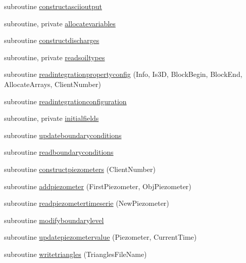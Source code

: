 \begin{DoxyCompactItemize}
subroutine \mbox{\hyperlink{namespacemoduleporousmedia_a14d726826714b21efcb1bdd8fe521dbc}{constructasciioutput}}
\item 
subroutine, private \mbox{\hyperlink{namespacemoduleporousmedia_a908fc394580adaa43494724ec7882eca}{allocatevariables}}
\item 
subroutine \mbox{\hyperlink{namespacemoduleporousmedia_ac4e498c09f58d0ecca6f79a2a268bb84}{constructdischarges}}
\item 
subroutine, private \mbox{\hyperlink{namespacemoduleporousmedia_a7aef95520258c11f2ce4493e2bef61c8}{readsoiltypes}}
\item 
subroutine \mbox{\hyperlink{namespacemoduleporousmedia_af773f6dce68c6222d17ca3f4fe88192d}{readintegrationpropertyconfig}} (Info, Is3D, Block\+Begin, Block\+End, Allocate\+Arrays, Client\+Number)
\item 
subroutine \mbox{\hyperlink{namespacemoduleporousmedia_afd9c6f0efb919260c9cb27d5f27faf98}{readintegrationconfiguration}}
\item 
subroutine, private \mbox{\hyperlink{namespacemoduleporousmedia_a35c831104f825a9f11f297800f87ecab}{initialfields}}
\item 
subroutine \mbox{\hyperlink{namespacemoduleporousmedia_ab48cf69fc08a66f3d4cfa5d9624e5ebf}{updateboundaryconditions}}
\item 
subroutine \mbox{\hyperlink{namespacemoduleporousmedia_afc9e4c782508e0d8b55b1c444d54d741}{readboundaryconditions}}
\item 
subroutine \mbox{\hyperlink{namespacemoduleporousmedia_ac3173bc46df00d4f9eeea325d87cd8d7}{constructpiezometers}} (Client\+Number)
\item 
subroutine \mbox{\hyperlink{namespacemoduleporousmedia_a367419c3e235d10645f9a8ef04d062b8}{addpiezometer}} (First\+Piezometer, Obj\+Piezometer)
\item 
subroutine \mbox{\hyperlink{namespacemoduleporousmedia_ab8846ea02c912ad7abc75b7736e11552}{readpiezometertimeserie}} (New\+Piezometer)
\item 
subroutine \mbox{\hyperlink{namespacemoduleporousmedia_a92e9c5aa327b8fb0f60c057a8885230d}{modifyboundarylevel}}
\item 
subroutine \mbox{\hyperlink{namespacemoduleporousmedia_a800f0d4d8cd48ad329f33e9bb42015a7}{updatepiezometervalue}} (Piezometer, Current\+Time)
\item 
subroutine \mbox{\hyperlink{namespacemoduleporousmedia_a9df397532d5ac8a58a2087f07677d385}{writetriangles}} (Triangles\+File\+Name)
\item 

\end{DoxyCompactItemize}
